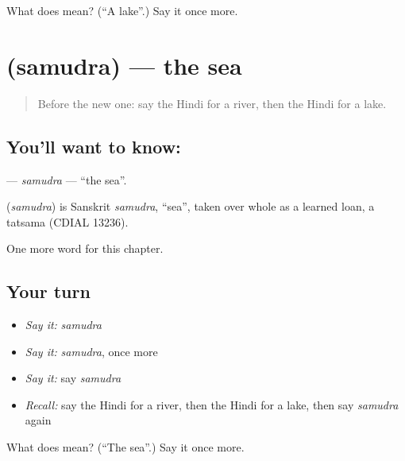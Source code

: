 \begin{tcolorbox}[breakable,colback=teal!4,colframe=teal!35!black,title={Before you move on}]
What does  mean? (\textquotedblleft{}A lake\textquotedblright{}.) Say it once more.
\end{tcolorbox}
\section[\texorpdfstring{\hi{समुद्र} (samudra)}{समुद्र (samudra)}]{ (samudra) — the sea}

\label{lesson:HI-C143-samudra}



\begin{quote}
Before the new one: say the Hindi for a river, then the Hindi for a lake.
\end{quote}

\subsection*{You'll want to know: }
\textbf{} — \emph{samudra} — \textquotedblleft{}the sea\textquotedblright{}.

\begin{cousinweb}
\textbf{} (\emph{samudra}) is Sanskrit \emph{samudra}, \textquotedblleft{}sea\textquotedblright{}, taken over whole as a learned loan, a tatsama (CDIAL 13236).
\end{cousinweb}

\begin{grammarlens}[title={What you've built}]
One more word for this chapter.
\end{grammarlens}

\subsection*{Your turn}
\begin{itemize}
\raggedright
  \item \emph{Say it:} \emph{samudra}
  \item \emph{Say it:} \emph{samudra}, once more
  \item \emph{Say it:} say \emph{samudra}
  \item \emph{Recall:} say the Hindi for a river, then the Hindi for a lake, then say \emph{samudra} again
\end{itemize}

\begin{tcolorbox}[breakable,colback=teal!4,colframe=teal!35!black,title={Before you move on}]
What does  mean? (\textquotedblleft{}The sea\textquotedblright{}.) Say it once more.
\end{tcolorbox}
